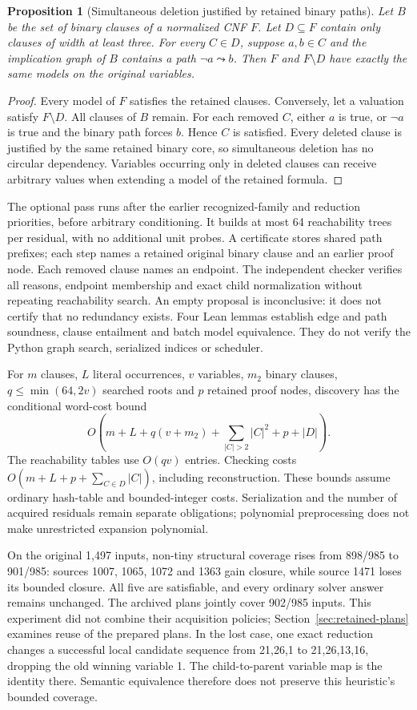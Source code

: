 \documentclass[11pt,a4paper]{article}
\numberwithin{equation}{section}
\theoremstyle{plain}
\newtheorem{proposition}[lemma]{Proposition}
\theoremstyle{definition}
\theoremstyle{remark}
\begin{document}
\begin{proposition}[Simultaneous deletion justified by retained binary paths]
\label{prop:retained-binary-paths}
Let $B$ be the set of binary clauses of a normalized CNF $F$. Let $D\subseteq F$ contain only clauses of width at least three. For every $C\in D$, suppose $a,b\in C$ and the implication graph of $B$ contains a path $\neg a\leadsto b$. Then $F$ and $F\setminus D$ have exactly the same models on the original variables.
\end{proposition}
\begin{proof}
Every model of $F$ satisfies the retained clauses. Conversely, let a valuation satisfy $F\setminus D$. All clauses of $B$ remain. For each removed $C$, either $a$ is true, or $\neg a$ is true and the binary path forces $b$. Hence $C$ is satisfied. Every deleted clause is justified by the same retained binary core, so simultaneous deletion has no circular dependency. Variables occurring only in deleted clauses can receive arbitrary values when extending a model of the retained formula.
\end{proof}

The optional pass runs after the earlier recognized-family and reduction priorities, before arbitrary conditioning. It builds at most 64 reachability trees per residual, with no additional unit probes. A certificate stores shared path prefixes; each step names a retained original binary clause and an earlier proof node. Each removed clause names an endpoint. The independent checker verifies all reasons, endpoint membership and exact child normalization without repeating reachability search. An empty proposal is inconclusive: it does not certify that no redundancy exists. Four Lean lemmas establish edge and path soundness, clause entailment and batch model equivalence. They do not verify the Python graph search, serialized indices or scheduler.

For $m$ clauses, $L$ literal occurrences, $v$ variables, $m_2$ binary clauses, $q\leq\min(64,2v)$ searched roots and $p$ retained proof nodes, discovery has the conditional word-cost bound
\[
 O\!\left(m+L+q(v+m_2)+\sum_{|C|>2}|C|^2+p+|D|\right).
\]
The reachability tables use $O(qv)$ entries. Checking costs $O(m+L+p+\sum_{C\in D}|C|)$, including reconstruction. These bounds assume ordinary hash-table and bounded-integer costs. Serialization and the number of acquired residuals remain separate obligations; polynomial preprocessing does not make unrestricted expansion polynomial.

On the original 1,497 inputs, non-tiny structural coverage rises from 898/985 to 901/985: sources 1007, 1065, 1072 and 1363 gain closure, while source 1471 loses its bounded closure. All five are satisfiable, and every ordinary solver answer remains unchanged. The archived plans jointly cover 902/985 inputs. This experiment did not combine their acquisition policies; Section~\ref{sec:retained-plans} examines reuse of the prepared plans. In the lost case, one exact reduction changes a successful local candidate sequence from 21,26,1 to 21,26,13,16, dropping the old winning variable 1. The child-to-parent variable map is the identity there. Semantic equivalence therefore does not preserve this heuristic's bounded coverage.
\end{document}
